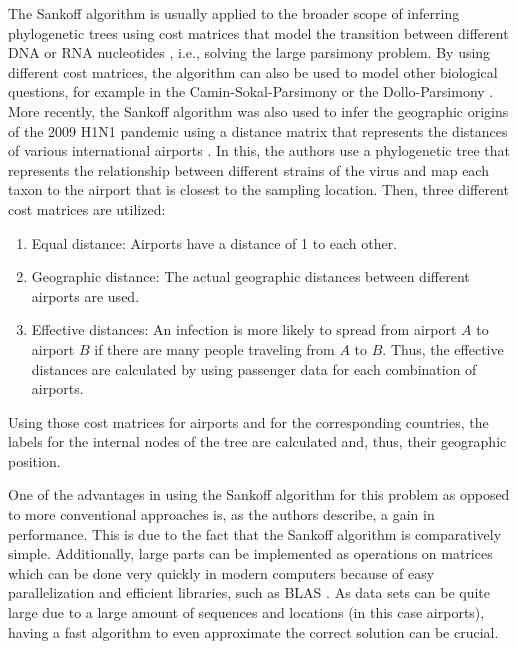 \documentclass{article}
\begin{document}
The Sankoff algorithm is usually applied to the broader scope of inferring
phylogenetic trees using cost matrices that model the transition between
different DNA or RNA nucleotides
\cite{jonesIntroductionBioinformaticsAlgorithms2004}, i.e., solving the large
parsimony problem. By using different cost matrices, the algorithm can also be
used to model other biological questions, for example in the
Camin-Sokal-Parsimony \cite{caminMethodDeducingBranching1965} or the
Dollo-Parsimony \cite{farrisPhylogeneticAnalysisDollo2022}. More recently, the
Sankoff algorithm was also used to infer the geographic origins of the 2009 H1N1
pandemic using a distance matrix that represents the distances of various
international airports \cite{reimeringPhylogeographicReconstructionUsing2020}.
In this, the authors use a phylogenetic tree that represents the relationship
between different strains of the virus and map each taxon to the airport that is
closest to the sampling location. Then, three different cost matrices are
utilized:

\begin{enumerate}
  \item Equal distance: Airports have a distance of 1 to each other.
  \item Geographic distance: The actual geographic distances between different
  airports are used.
  \item Effective distances: An infection is more likely to spread from airport
  $A$ to airport $B$ if there are many people traveling from $A$ to $B$. Thus,
  the effective distances are calculated by using passenger data for each
  combination of airports.
\end{enumerate}

Using those cost matrices for airports and for the corresponding countries, the
labels for the internal nodes of the tree are calculated and, thus, their
geographic position.

One of the advantages in using the Sankoff algorithm for this problem as opposed
to more conventional approaches is, as the authors describe, a gain in
performance. This is due to the fact that the Sankoff algorithm is comparatively
simple. Additionally, large parts can be implemented as operations on matrices
which can be done very quickly in modern computers because of easy
parallelization and efficient libraries, such as BLAS
\cite{lawsonBasicLinearAlgebra1979}. As data sets can be quite large due to a
large amount of sequences and locations (in this case airports), having a fast
algorithm to even approximate the correct solution can be crucial.
\end{document}
